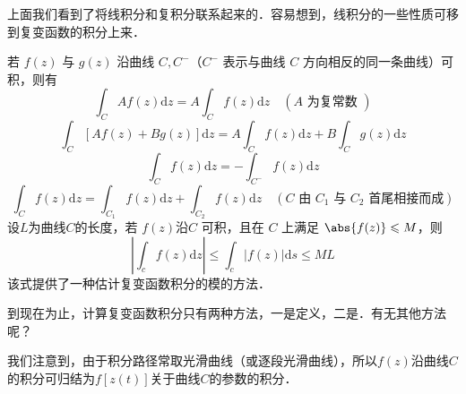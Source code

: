 上面我们看到了将线积分和复积分联系起来的．容易想到，线积分的一些性质可移到复变函数的积分上来．

若 $f(z)$ 与 $g(z)$ 沿曲线 $C,C^-$（$C^-$ 表示与曲线 $C$ 方向相反的同一条曲线）可积，则有
\begin{equation}
\int_{C} A f(z) \mathrm{d} z=A \int_{C} f(z) \mathrm{d} z \quad(A \text { 为复常数 })
\end{equation}
\begin{equation}
\int_{C}[Af(z)+ Bg(z)] \mathrm{d} z= A\int_{C} f(z) \mathrm{d} z + B\int_{C} g(z) \mathrm{d} z
\end{equation}
\begin{equation} 
\int_{C} f(z) \mathrm{d} z=-\int_{C^{-}} f(z) \mathrm{d} z
\end{equation}
\begin{equation}
\int_{C} f(z) \mathrm{d} z=\int_{C_{1}} f(z) \mathrm{d} z+\int_{C_{2}} f(z) \mathrm{d} z \quad\left(C \text{ 由 } C_{1} \text{ 与 } C_{2} \text { 首尾相接而成}\right)
\end{equation}
设$ L$为曲线$C$的长度，若 $f (z)$沿$C$ 可积，且在 $C$ 上满足 $\abs{f(z)} \leqslant M $，则
\begin{equation} \label{CpxInt_eq2}
\left|\int_{c} f(z) \mathrm{d} z\right| \leqslant \int_{c}|f(z)| \mathrm{d} s \leqslant M L
\end{equation}
该式提供了一种估计复变函数积分的模的方法．


到现在为止，计算复变函数积分只有两种方法，一是定义，二是．有无其他方法呢？

我们注意到，由于积分路径常取光滑曲线（或逐段光滑曲线），所以$ f (z) $沿曲线$C $的积分可归结为$f [z(t)]$关于曲线$C$的参数的积分．

